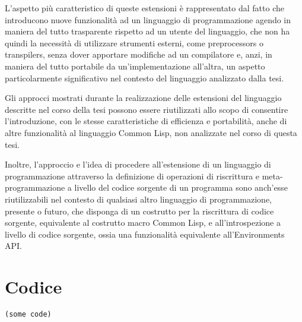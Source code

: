 \documentclass{book}
\begin{document}
L'aspetto più caratteristico di queste estensioni è rappresentato dal fatto che
introducono nuove funzionalità ad un linguaggio di programmazione agendo in
maniera del tutto trasparente rispetto ad un utente del linguaggio, che non ha
quindi la necessità di utilizzare strumenti esterni, come preprocessors o
transpilers, senza dover apportare modifiche ad un compilatore e, anzi, in
maniera del tutto portabile da un'implementazione all'altra, un aspetto
particolarmente significativo nel contesto del linguaggio analizzato dalla tesi.

Gli approcci mostrati durante la realizzazione delle estensioni del linguaggio
descritte nel corso della tesi possono essere riutilizzati allo scopo di
consentire l'introduzione, con le stesse caratteristiche di efficienza e
portabilità, anche di altre funzionalità al linguaggio Common Lisp, non
analizzate nel corso di questa tesi.

Inoltre, l'approccio e l'idea di procedere all'estensione di un linguaggio di
programmazione attraverso la definizione di operazioni di riscrittura e meta-
programmazione a livello del codice sorgente di un programma sono anch'esse
riutilizzabili nel contesto di qualsiasi altro linguaggio di programmazione,
presente o futuro, che disponga di un costrutto per la riscrittura di codice
sorgente, equivalente al costrutto macro Common Lisp, e all'introspezione a
livello di codice sorgente, ossia una funzionalità equivalente all'Environments
API.

\appendix

\chapter{Codice}

\begin{lstlisting}
(some code)
\end{lstlisting}

\printbibliography[filter=papers,title={Articoli Citati}]
\printbibliography[type=book,title={Bibliografia}]
\printbibliography[type=misc,title={Sitografia}]
\end{document}
